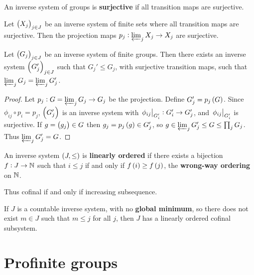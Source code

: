 \pagebreak

\begin{definition}
An inverse system of groups is \textbf{surjective} if all transition maps are surjective.
\end{definition}

\begin{proposition}
Let $ \br{X_j}_{j \in J} $ be an inverse system of finite sets where all transition maps are surjective. Then the projection maps $ p_j : \varprojlim_j X_j \to X_j $ are surjective.
\end{proposition}

\begin{proposition}
\label{prop:1.3.7}
Let $ \br{G_j}_{j \in J} $ be an inverse system of finite groups. Then there exists an inverse system $ \br{G_j'}_{j \in J} $ such that $ G_j' \le G_j $, with surjective transition maps, such that $ \varprojlim_j G_j = \varprojlim_j G_j' $.
\end{proposition}

\begin{proof}
Let $ p_j : G = \varprojlim_j G_j \to G_j $ be the projection. Define $ G_j' = p_j\br{G} $. Since $ \phi_{ij} \circ p_i = p_j $, $ \br{G_j'} $ is an inverse system with $ \left. \phi_{ij} \right|_{G_i'} : G_i' \to G_j' $, and $ \left. \phi_{ij} \right|_{G_i'} $ is surjective. If $ g = \br{g_j} \in G $ then $ g_j = p_j\br{g} \in G_j' $, so $ g \in \varprojlim_j G_j' \le G \le \prod_j G_j $. Thus $ \varprojlim_j G_j' = G $.
\end{proof}

\begin{definition}
An inverse system $ \br{J, \le} $ is \textbf{linearly ordered} if there exists a bijection $ f : J \to \mathbb{N} $ such that $ i \le j $ if and only if $ f\br{i} \ge f\br{j} $, the \textbf{wrong-way ordering} on $ \mathbb{N} $.
\end{definition}

Thus cofinal if and only if increasing subsequence.

\begin{proposition}
\label{prop:1.3.11}
If $ J $ is a countable inverse system, with no \textbf{global minimum}, so there does not exist $ m \in J $ such that $ m \le j $ for all $ j $, then $ J $ has a linearly ordered cofinal subsystem.
\end{proposition}

\pagebreak

\section{Profinite groups}

